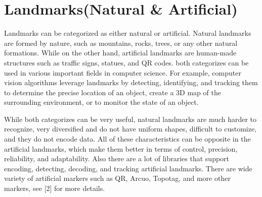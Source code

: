 \section{Landmarks(Natural \& Artificial)}

Landmarks can be categorized as either natural or artificial. Natural landmarks
are formed by nature, such as mountains, rocks, trees, or any other natural
formations. While on the other hand, artificial landmarks are human-made
structures such as traffic signs, statues, and QR codes. both categorizes can be used in various important fields in computer science. For example, computer vision algorithms leverage landmarks by detecting, identifying, and tracking them to determine the precise location of an object, create a 3D map of the surrounding environment, or to monitor the state of an object.

While both categorizes can be very useful, natural landmarks are much harder to recognize, very diversified and do not have uniform shapes, difficult to customize, and they do not encode data. All of these characteristics can be opposite in the artificial landmarks, which make them better in terms of control, precision, reliability, and adaptability. Also there are a lot of libraries that support encoding, detecting, decoding, and tracking artificial landmarks. There are wide variety of artificial markers such as QR, Arcuo, Topotag, and more other markers, see [2] for more details.

	
